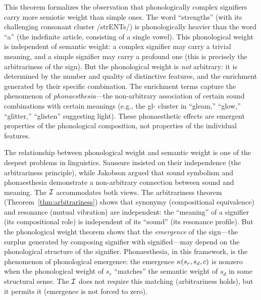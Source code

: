 \begin{interpretation}
This theorem formalizes the observation that phonologically complex signifiers carry more semiotic weight than simple ones. The word ``strengths'' (with its challenging consonant cluster /strENTs/) is phonologically heavier than the word ``a'' (the indefinite article, consisting of a single vowel). This phonological weight is independent of semantic weight: a complex signifier may carry a trivial meaning, and a simple signifier may carry a profound one (this is precisely the arbitrariness of the sign). But the phonological weight is \emph{not} arbitrary: it is determined by the number and quality of distinctive features, and the enrichment generated by their specific combination. The enrichment terms capture the phenomenon of \emph{phonaesthesia}---the non-arbitrary association of certain sound combinations with certain meanings (e.g., the gl- cluster in ``gleam,'' ``glow,'' ``glitter,'' ``glisten'' suggesting light). These phonaesthetic effects are emergent properties of the phonological composition, not properties of the individual features.
\end{interpretation}

\begin{remark}
The relationship between phonological weight and semantic weight is one of the deepest problems in linguistics. Saussure insisted on their independence (the arbitrariness principle), while Jakobson argued that sound symbolism and phonaesthesia demonstrate a non-arbitrary connection between sound and meaning. The $\mathcal{I}$ accommodates both views. The arbitrariness theorem (Theorem~\ref{thm:arbitrariness}) shows that synonymy (compositional equivalence) and resonance (mutual vibration) are independent: the ``meaning'' of a signifier (its compositional role) is independent of its ``sound'' (its resonance profile). But the phonological weight theorem shows that the \emph{emergence} of the sign---the surplus generated by composing signifier with signified---may depend on the phonological structure of the signifier. Phonaesthesia, in this framework, is the phenomenon of phonological emergence: the emergence $\kappa(s_r, s_d, c)$ is nonzero when the phonological weight of $s_r$ ``matches'' the semantic weight of $s_d$ in some structural sense. The $\mathcal{I}$ does not require this matching (arbitrariness holds), but it permits it (emergence is not forced to zero).
\end{remark}

